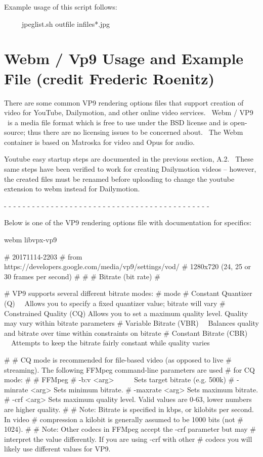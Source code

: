 Example usage of this script follows:
\medskip

\ \ \ \ \ jpeglist.sh outfile infiles*.jpg
\medskip

\section{Webm / Vp9 Usage and Example File (credit Frederic Roenitz)}
\label{sec:Webm / Vp9 Usage and Example File}

There are some common VP9 rendering options files that support creation of video for YouTube, Dailymotion, and other online video services. \ Webm / VP9 \ is a media file format which is free to use under the BSD license and is open-source; thus there are no licensing issues to be concerned about. \ The Webm container is based on Matroska for video and Opus for audio.
\medskip

Youtube easy startup steps are documented in the previous section, A.2. \ These same steps have been verified to work for creating Dailymotion videos -- however, the created files must be renamed before uploading to change the youtube extension to webm instead for Dailymotion.

{}- - - - - - - - - - - - - - - - - - - - - - - - - - - - - - - - - - - - - - - - - - - -
\medskip

Below is one of the VP9 rendering options file with documentation for specifics:
\medskip

webm libvpx-vp9
\medskip

\# 20171114-2203
\# from https://developers.google.com/media/vp9/settings/vod/
\# 1280x720 (24, 25 or 30 frames per second)
\#
\#
\# Bitrate (bit rate)
\#

\# VP9 supports several different bitrate modes:
\# mode 
\# Constant Quantizer (Q) \ \ Allows you to specify a fixed quantizer value; bitrate will vary
\# Constrained Quality (CQ) Allows you to set a maximum quality level. Quality may vary within bitrate parameters
\# Variable Bitrate (VBR) \ \ Balances quality and bitrate over time within constraints on bitrate
\# Constant Bitrate (CBR) \ \ Attempts to keep the bitrate fairly constant while quality varies

\#
\# CQ mode is recommended for file-based video (as opposed to live
\# streaming). The following FFMpeg command-line parameters are used
\# for CQ mode:
\#
\# FFMpeg 
\# -b:v {\textless}arg{\textgreater} \ \ \ \ \ Sets target bitrate (e.g. 500k)
\# -minrate {\textless}arg{\textgreater} Sets minimum bitrate.
\# -maxrate {\textless}arg{\textgreater} Sets maximum bitrate.
\# -crf {\textless}arg{\textgreater} Sets maximum quality level. Valid values are 0-63, lower numbers are higher quality.
\#
\# Note: Bitrate is specified in kbps, or kilobits per second. In video
\# compression a kilobit is generally assumed to be 1000 bits (not
\# 1024).
\#
\# Note: Other codecs in FFMpeg accept the -crf parameter but may
\# interpret the value differently. If you are using -crf with other
\# codecs you will likely use different values for VP9.

